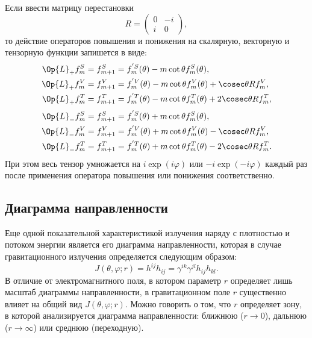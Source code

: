 \documentclass[\docroot/reports/draft/report.tex]{subfiles}
\begin{document}
    Если ввести матрицу перестановки
    \begin{equation}
        R = \begin{pmatrix}0&-i\\i&0\end{pmatrix} ,
    \end{equation}
    то действие операторов повышения и понижения на скалярную, векторную и тензорную функции запишется в виде:
    \begin{equation}\begin{aligned}
        \Op{L}_{+} f^S_m &= f^S_{m+1} =
            f^{'S}_m(\theta) - m \cot\theta f^S_m(\theta), \\
        \Op{L}_{+} f^V_m &= f^V_{m+1} =
            f^{'V}_m(\theta) - m \cot\theta f^V_m(\theta) + \cosec\theta R f^V_m, \\
        \Op{L}_{+} f^T_m &= f^T_{m+1} =
            f^{'T}_m(\theta) - m \cot\theta f^T_m(\theta) + 2\cosec\theta R f^T_m,
    \end{aligned}\end{equation}
    \begin{equation}\begin{aligned}
        \Op{L}_{-} f^S_m &= f^S_{m+1} =
            f^{'S}_m(\theta) + m \cot\theta f^S_m(\theta), \\
        \Op{L}_{-} f^V_m &= f^V_{m+1} =
            f^{'V}_m(\theta) + m \cot\theta f^V_m(\theta) - \cosec\theta R f^V_m, \\
        \Op{L}_{-} f^T_m &= f^T_{m+1} =
            f^{'T}_m(\theta) + m \cot\theta f^T_m(\theta) - 2\cosec\theta R f^T_m.
    \end{aligned}\end{equation}
    При этом весь тензор умножается на $i \exp(i\varphi)$ или $-i \exp(-i\varphi)$ каждый раз после применения оператора повышения или понижения соответственно.

\subsection{Диаграмма направленности}

    Еще одной показательной характеристикой излучения наряду с плотностью и потоком энергии является его диаграмма направленности, которая в случае гравитационного излучения определяется следующим образом:
    \begin{equation}\label{eq:radp}
        J(\theta,\varphi;r) = h^{ij}h_{ij} = \gamma^{ik}\gamma^{jl}h_{ij}h_{kl}.
    \end{equation}
    В отличие от электромагнитного поля, в котором параметр $r$ определяет лишь масштаб диаграммы направленности, в гравитационном поле $r$ существенно влияет на общий вид $J(\theta,\varphi;r)$. Можно говорить о том, что $r$ определяет зону, в которой анализируется диаграмма направленности: ближнюю ($r \to 0$), дальнюю ($r \to \infty$) или среднюю (переходную).
\end{document}

